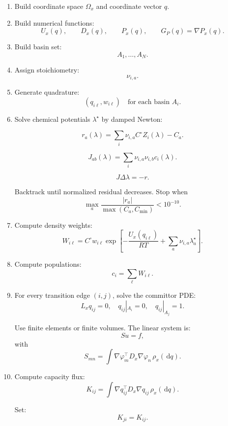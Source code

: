 \documentclass[11pt]{article}
\newcommand{\dd}{\,\mathrm d}
\begin{document}
  \begin{enumerate}

  \item Build coordinate space \(\Omega_x\) and coordinate vector \(q\).

  \item Build numerical functions:
  \[
  U_x(q),
  \qquad
  D_x(q),
  \qquad
  P_x(q),
  \qquad
  G_P(q)=\nabla P_x(q).
  \]

  \item Build basin set:
  \[
  A_1,\ldots,A_N.
  \]

  \item Assign stoichiometry:
  \[
  \nu_{i,a}.
  \]

  \item Generate quadrature:
  \[
  (q_{i\ell},w_{i\ell})
  \quad
  \text{for each basin }A_i.
  \]

  \item Solve chemical potentials \(\lambda^\star\) by damped Newton:

  \[
  r_a(\lambda)=\sum_i\nu_{i,a}C^\circ Z_i(\lambda)-C_a.
  \]

  \[
  J_{ab}(\lambda)=\sum_i\nu_{i,a}\nu_{i,b}c_i(\lambda).
  \]

  \[
  J\Delta\lambda=-r.
  \]

  Backtrack until normalized residual decreases. Stop when
  \[
  \max_a\frac{|r_a|}{\max(C_a,C_{\min})}<10^{-10}.
  \]

  \item Compute density weights:
  \[
  W_{i\ell}
  =
  C^\circ
  w_{i\ell}
  \exp
  \left[
  -\frac{U_x(q_{i\ell})}{RT}
  +
  \sum_a\nu_{i,a}\lambda_a^\star
  \right].
  \]

  \item Compute populations:
  \[
  c_i=\sum_\ell W_{i\ell}.
  \]

  \item For every transition edge \((i,j)\), solve the committor PDE:
  \[
  L_xq_{ij}=0,
  \quad
  q_{ij}|_{A_i}=0,
  \quad
  q_{ij}|_{A_j}=1.
  \]

  Use finite elements or finite volumes. The linear system is:
  \[
  S u=f,
  \]
  with
  \[
  S_{mn}
  =
  \int
  \nabla\varphi_m^\top D_x\nabla\varphi_n
  \,\rho_x(\dd q).
  \]

  \item Compute capacity flux:
  \[
  K_{ij}
  =
  \int
  \nabla q_{ij}^\top D_x\nabla q_{ij}
  \,\rho_x(\dd q).
  \]

  Set:
  \[
  K_{ji}=K_{ij}.
  \]


\end{enumerate}
\end{document}
